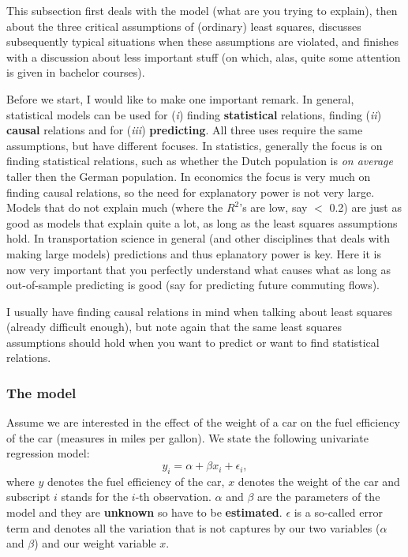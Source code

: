 \documentclass[]{article}
\begin{document}
This subsection first deals with the model (what are you trying to
explain), then about the three critical assumptions of (ordinary) least
squares, discusses subsequently typical situations when these
assumptions are violated, and finishes with a discussion about less
important stuff (on which, alas, quite some attention is given in
bachelor courses).

Before we start, I would like to make one important remark. In general,
statistical models can be used for (\emph{i}) finding
\textbf{statistical} relations, finding (\emph{ii}) \textbf{causal}
relations and for (\emph{iii}) \textbf{predicting}. All three uses
require the same assumptions, but have different focuses. In statistics,
generally the focus is on finding statistical relations, such as whether
the Dutch population is \emph{on average} taller then the German
population. In economics the focus is very much on finding causal
relations, so the need for explanatory power is not very large. Models
that do not explain much (where the \(R^2\)'s are low, say \(<\) 0.2)
are just as good as models that explain quite a lot, as long as the
least squares assumptions hold. In transportation science in general
(and other disciplines that deals with making large models) predictions
and thus eplanatory power is key. Here it is now very important that you
perfectly understand what causes what as long as out-of-sample
predicting is good (say for predicting future commuting flows).

I usually have finding causal relations in mind when talking about least
squares (already difficult enough), but note again that the same least
squares assumptions should hold when you want to predict or want to find
statistical relations.

\subsubsection{The model}\label{the-model}

Assume we are interested in the effect of the weight of a car on the
fuel efficiency of the car (measures in miles per gallon). We state the
following univariate regression model: \[
y_i = \alpha + \beta x_i + \epsilon_i,
\] where \(y\) denotes the fuel efficiency of the car, \(x\) denotes the
weight of the car and subscript \(i\) stands for the \(i\)-th
observation. \(\alpha\) and \(\beta\) are the parameters of the model
and they are \textbf{unknown} so have to be \textbf{estimated}.
\(\epsilon\) is a so-called error term and denotes all the variation
that is not captures by our two variables (\(\alpha\) and \(\beta\)) and
our weight variable \(x\).
\end{document}
